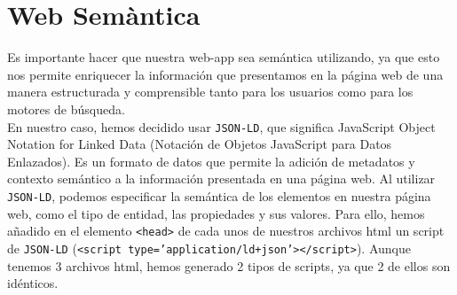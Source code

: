 \documentclass{article}
\begin{document}
\section{Web Semàntica}
Es importante hacer que nuestra web-app sea semántica utilizando, ya que esto nos permite enriquecer la información que presentamos en la página web de una manera estructurada y comprensible tanto para los usuarios como para los motores de búsqueda.\\

\noindent En nuestro caso, hemos decidido usar \texttt{JSON-LD}, que significa JavaScript Object Notation for Linked Data (Notación de Objetos JavaScript para Datos Enlazados). Es un formato de datos que permite la adición de metadatos y contexto semántico a la información presentada en una página web. Al utilizar \texttt{JSON-LD}, podemos especificar la semántica de los elementos en nuestra página web, como el tipo de entidad, las propiedades y sus valores. Para ello, hemos añadido en el elemento \texttt{<head>} de cada unos de nuestros archivos html un script de \texttt{JSON-LD} (\texttt{<script type='application/ld+json'></script>}). Aunque tenemos 3 archivos html, hemos generado 2 tipos de scripts, ya que 2 de ellos son idénticos.
\end{document}
